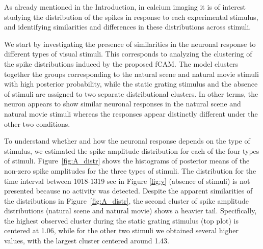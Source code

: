 %
As already mentioned in the Introduction, in calcium imaging it is of interest studying the distribution of the spikes in response to each experimental stimulus, and identifying similarities and differences in these distributions across stimuli. 

We start by investigating the presence of similarities in the neuronal response to different types of visual stimuli. This corresponds to analyzing the clustering of the spike distributions induced by the proposed fCAM. The model clusters together the groups corresponding to the natural scene and natural movie stimuli with high posterior probability, while the static grating stimulus and the absence of stimuli are assigned to two separate distributional clusters. In other terms, the neuron appears to show similar neuronal responses in the natural scene and natural movie stimuli whereas the responses appear distinctly different under the other two conditions. 



To understand whether and how the neuronal response depends on the type of stimulus, we estimated the spike amplitude distribution for each of the four types of stimuli. Figure~\ref{fig:A_distr} shows the histograms of posterior means of the non-zero spike amplitudes for the three types of stimuli. The distribution for the time interval between 1018-1319 sec in Figure \ref{fig:y} (absence of stimuli) is not presented because no activity was detected. Despite the apparent similarities of the distributions in Figure~\ref{fig:A_distr}, the second cluster of spike amplitude distributions (natural scene and natural movie) shows a heavier tail. 
Specifically, the highest observed cluster during the static grating stimulus (top plot) is centered at 1.06, while for the other two stimuli we obtained several higher values, with the largest cluster centered around 1.43. 

